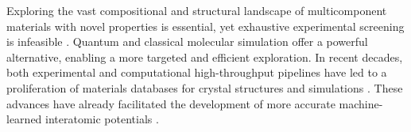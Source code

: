 


Exploring the vast compositional and structural landscape of multicomponent materials with novel properties is essential, yet exhaustive experimental screening is infeasible \citep{cantor_multicomponent_2021}. Quantum and classical molecular simulation offer a powerful alternative, enabling a more targeted and efficient exploration.
In recent decades, both experimental \citep{potyrailo_combinatorial_2011, maier_early_2019} and computational \citep{jain_highthroughput_2011, curtarolo_highthroughput_2013} high-throughput pipelines have led to a proliferation of materials databases for crystal structures \citep{bergerhoff_inorganic_1983, mehl_aflow_2017} and simulations \citep{blaiszik_materials_2016, vita_colabfit_2023, fuemmeler2024advancing}. These advances have already facilitated the development of more accurate machine-learned interatomic potentials \citep{batzner_e3equivariant_2022, batatia_mace_2022, chen_universal_2022}.

